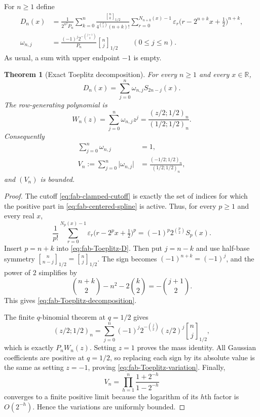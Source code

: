 \documentclass[11pt,oneside,openany]{book}
\newtheorem{theorem}{Theorem}[chapter]
\theoremstyle{definition}
\theoremstyle{remark}
\newcommand{\Qbinom}[3]{\genfrac{[}{]}{0pt}{}{#1}{#2}_{#3}}
\newcommand{\R}{\mathbb R}
\newcommand{\abs}[1]{\lvert #1\rvert}
\newcommand{\defeq}{\mathrel{:=}}
\begin{document}
For $n\ge1$ define
\begin{align}
 D_n(x)
 &=\frac1{2^{n^2}P_n}
 \sum_{k=0}^{n}
 \frac{\Qbinom nk{1/2}}{4^{\binom k2}(n+k)!}
 \sum_{r=0}^{N_{n+k}(x)-1}\varepsilon_r
 \bigl(r-2^{n+k}x+\tfrac12\bigr)^{n+k},
 \label{eq:fab-Toeplitz-D}\\
 \omega_{n,j}
 &=\frac{(-1)^j2^{-\binom{j+1}{2}}}{P_n}
   \Qbinom nj{1/2}
 \qquad(0\le j\le n).
 \label{eq:fab-Toeplitz-weight}
\end{align}
As usual, a sum with upper endpoint $-1$ is empty.

\begin{theorem}[Exact Toeplitz decomposition]
\label{thm:fab-Toeplitz-decomposition}
For every $n\ge1$ and every $x\in\R$,
\begin{equation}
 \boxed{D_n(x)=\sum_{j=0}^{n}\omega_{n,j}S_{2n-j}(x).}
 \label{eq:fab-Toeplitz-decomposition}
\end{equation}
The row-generating polynomial is
\begin{equation}
 W_n(z)=\sum_{j=0}^{n}\omega_{n,j}z^j
 =\frac{(z/2;1/2)_n}{(1/2;1/2)_n}.
 \label{eq:fab-Toeplitz-row-polynomial}
\end{equation}
Consequently
\begin{align}
 \sum_{j=0}^{n}\omega_{n,j}&=1,
 \label{eq:fab-Toeplitz-mass}\\
 V_n\defeq\sum_{j=0}^{n}\abs{\omega_{n,j}}
 &=\frac{(-1/2;1/2)_n}{(1/2;1/2)_n},
 \label{eq:fab-Toeplitz-variation}
\end{align}
and $(V_n)$ is bounded.
\end{theorem}

\begin{proof}
The cutoff \eqref{eq:fab-clamped-cutoff} is exactly the set of indices for
which the positive part in \eqref{eq:fab-centered-spline} is active.  Thus,
for every $p\ge1$ and every real $x$,
\begin{equation}
 \frac1{p!}
 \sum_{r=0}^{N_p(x)-1}\varepsilon_r
 \bigl(r-2^px+\tfrac12\bigr)^p
 =(-1)^p2^{\binom p2}S_p(x).
 \label{eq:fab-cutoff-to-spline}
\end{equation}
Insert $p=n+k$ into \eqref{eq:fab-Toeplitz-D}.  Then put $j=n-k$ and use
half-base symmetry
$\Qbinom n{n-j}{1/2}=\Qbinom nj{1/2}$.  The sign becomes
$(-1)^{n+k}=(-1)^j$, and the power of $2$ simplifies by
\[
 \binom{n+k}{2}-n^2-2\binom{k}{2}
 =-\binom{j+1}{2}.
\]
This gives \eqref{eq:fab-Toeplitz-decomposition}.

The finite $q$-binomial theorem at $q=1/2$ gives
\[
 (z/2;1/2)_n
 =\sum_{j=0}^{n}(-1)^j
   2^{-\binom j2}(z/2)^j\Qbinom nj{1/2},
\]
which is exactly $P_nW_n(z)$.  Setting $z=1$ proves the mass identity.
All Gaussian coefficients are positive at $q=1/2$, so replacing each sign by
its absolute value is the same as setting $z=-1$, proving
\eqref{eq:fab-Toeplitz-variation}.  Finally,
\[
 V_n=\prod_{h=1}^{n}\frac{1+2^{-h}}{1-2^{-h}}
\]
converges to a finite positive limit because the logarithm of its $h$th
factor is $O(2^{-h})$.  Hence the variations are uniformly bounded.
\end{proof}
\end{document}

